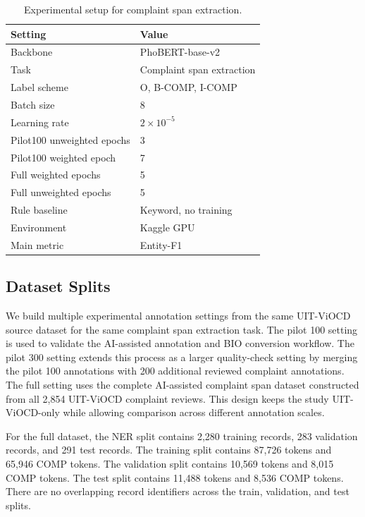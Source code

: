 \documentclass[11pt]{article}
\begin{document}
\begin{table}[t]
\centering
\small
\setlength{\tabcolsep}{3pt}
\renewcommand{\arraystretch}{0.95}
\begin{tabular}{ll}
\toprule
Setting & Value \\
\midrule
Backbone & PhoBERT-base-v2 \\
Task & Complaint span extraction \\
Label scheme & O, B-COMP, I-COMP \\
Batch size & 8 \\
Learning rate & \(2 \times 10^{-5}\) \\
Pilot100 unweighted epochs & 3 \\
Pilot100 weighted epoch & 7 \\
Full weighted epochs & 5 \\
Full unweighted epochs & 5 \\
Rule baseline & Keyword, no training \\
Environment & Kaggle GPU \\
Main metric & Entity-F1 \\
\bottomrule
\end{tabular}
\caption{Experimental setup for complaint span extraction.}
\label{tab:experimental-setup}
\end{table}

\subsection{Dataset Splits}

We build multiple experimental annotation settings from the same UIT-ViOCD source dataset for the same complaint span extraction task. The pilot 100 setting is used to validate the AI-assisted annotation and BIO conversion workflow. The pilot 300 setting extends this process as a larger quality-check setting by merging the pilot 100 annotations with 200 additional reviewed complaint annotations. The full setting uses the complete AI-assisted complaint span dataset constructed from all 2,854 UIT-ViOCD complaint reviews. This design keeps the study UIT-ViOCD-only while allowing comparison across different annotation scales.

For the full dataset, the NER split contains 2,280 training records, 283 validation records, and 291 test records. The training split contains 87,726 tokens and 65,946 COMP tokens. The validation split contains 10,569 tokens and 8,015 COMP tokens. The test split contains 11,488 tokens and 8,536 COMP tokens. There are no overlapping record identifiers across the train, validation, and test splits.
\end{document}
